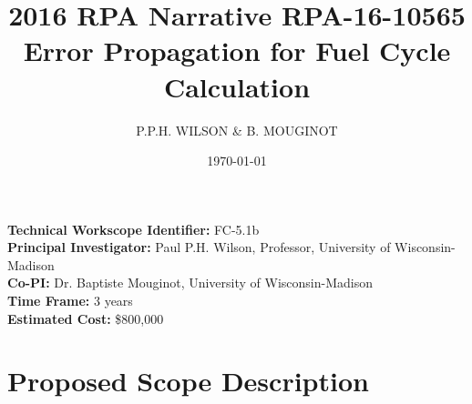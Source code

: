 \documentclass[dvips,12pt]{article}
\title{2016 RPA Narrative RPA-16-10565\\
Error Propagation for Fuel Cycle Calculation}
\author{P.P.H. WILSON \& B. MOUGINOT}
\date{\today}
\begin{document}
\maketitle 



\noindent\textbf{Technical Workscope Identifier:} FC-5.1b\\
\textbf{Principal Investigator:} Paul P.H. Wilson, Professor, University of Wisconsin-Madison\\
\textbf{Co-PI:} Dr. Baptiste Mouginot, University of Wisconsin-Madison\\
\textbf{Time Frame:} 3 years\\
\textbf{Estimated Cost:} \$800,000\\


\section{Proposed Scope Description}
\end{document}
